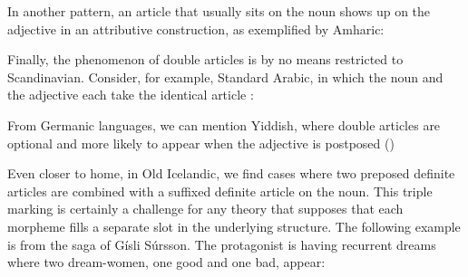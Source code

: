 In another pattern, an article that usually sits on the noun shows up on the adjective in an attributive construction, as exemplified by Amharic:


\ea\label{}

\z 
\z 

Finally, the phenomenon of double articles is by no means restricted to Scandinavian. Consider, for example, Standard Arabic, in which the noun and the adjective each take the identical article :


\ea\label{}

\z 
\z 

From Germanic languages, we can mention Yiddish, where double articles are optional and more likely to appear when the adjective is postposed (\citet[342-347]{Plank2003})


\ea\label{}

\z 
\z 

Even closer to home, in Old Icelandic, we find cases where two preposed definite articles are combined with a suffixed definite article on the noun. This triple marking is certainly a challenge for any theory that supposes that each morpheme fills a separate slot in the underlying structure. The following example is from the saga of Gísli Súrsson. The protagonist is having recurrent dreams where two dream-women, one good and one bad, appear: 

